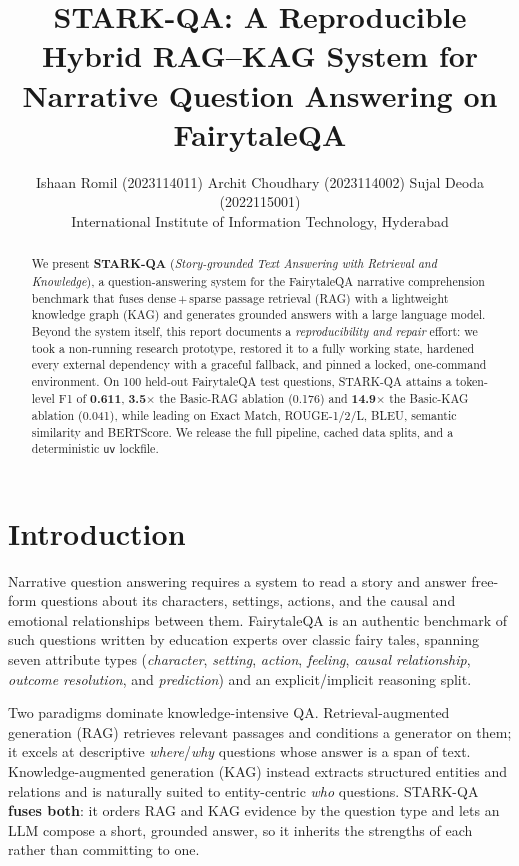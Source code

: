 \documentclass[11pt]{article}
\title{STARK-QA: A Reproducible Hybrid RAG--KAG System for\\Narrative Question Answering on FairytaleQA}
\author{Ishaan Romil (2023114011) \quad Archit Choudhary (2023114002) \quad
  Sujal Deoda (2022115001) \\
  International Institute of Information Technology, Hyderabad}
\begin{document}
\maketitle

\begin{abstract}
We present \textbf{STARK-QA} (\emph{Story-grounded Text Answering with Retrieval
and Knowledge}), a question-answering system for the FairytaleQA narrative
comprehension benchmark that fuses dense\,+\,sparse passage retrieval (RAG) with
a lightweight knowledge graph (KAG) and generates grounded answers with a
large language model. Beyond the system itself, this report documents a
\emph{reproducibility and repair} effort: we took a non-running research
prototype, restored it to a fully working state, hardened every external
dependency with a graceful fallback, and pinned a locked, one-command
environment. On 100 held-out FairytaleQA test questions, STARK-QA attains a
token-level F1 of \textbf{0.611}, \textbf{3.5$\times$} the Basic-RAG ablation
(0.176) and \textbf{14.9$\times$} the Basic-KAG ablation (0.041), while leading
on Exact Match, ROUGE-1/2/L, BLEU, semantic similarity and BERTScore. We release
the full pipeline, cached data splits, and a deterministic \texttt{uv} lockfile.
\end{abstract}

\section{Introduction}
Narrative question answering requires a system to read a story and answer
free-form questions about its characters, settings, actions, and the causal and
emotional relationships between them. FairytaleQA \citep{xu-etal-2022-fairytaleqa}
is an authentic benchmark of such questions written by education experts over
classic fairy tales, spanning seven attribute types (\emph{character},
\emph{setting}, \emph{action}, \emph{feeling}, \emph{causal relationship},
\emph{outcome resolution}, and \emph{prediction}) and an explicit/implicit
reasoning split.

Two paradigms dominate knowledge-intensive QA. Retrieval-augmented generation
(RAG) \citep{lewis2020rag} retrieves relevant passages and conditions a generator
on them; it excels at descriptive \emph{where}/\emph{why} questions whose answer
is a span of text. Knowledge-augmented generation (KAG) instead extracts
structured entities and relations \citep{pan2024kgsurvey} and is naturally suited
to entity-centric \emph{who} questions. STARK-QA \textbf{fuses both}: it orders
RAG and KAG evidence by the question type and lets an LLM compose a short,
grounded answer, so it inherits the strengths of each rather than committing to
one.
\end{document}
